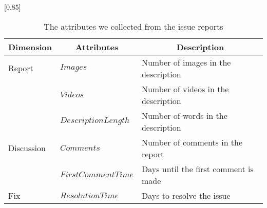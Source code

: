 
\begin{table}[t]
    \begin{center}
    \caption{The attributes we collected from the issue reports}
    \scalebox{0.85}[0.85]{
    \begin{tabular}{llp{4.6cm}} 
        \toprule
        \multicolumn{1}{c}{\textbf{Dimension}}&\multicolumn{1}{c}{\textbf{Attributes}} & \multicolumn{1}{c}{\textbf{Description}} \\ 
        \midrule
        Report&$Images$ & Number of images in the description \\
        &$Videos$ & Number of videos in the description \\
        &$DescriptionLength$ & Number of words in the description\\
        \hline
        Discussion&$Comments$ & Number of comments in the report\\
        &$FirstCommentTime$ & Days until the first comment is made \\
        
        \hline
        Fix&$ResolutionTime$ & Days to resolve the issue \\

        \bottomrule
    \end{tabular}
    }
    \label{tab:issue-attr}
    \end{center}
\end{table}

